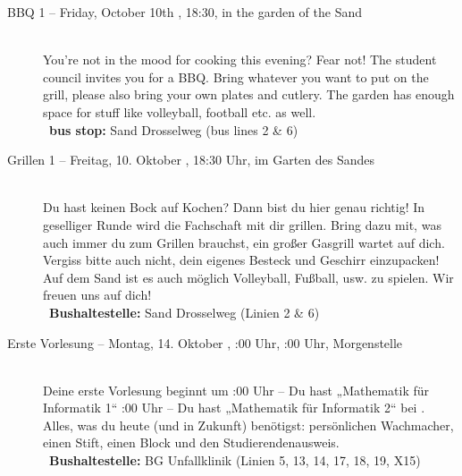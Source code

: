 \begin{description}

\ifml
    \item[BBQ 1 -- Friday, October 10th \YEAR, 18:30, in the garden of the Sand]~\\
    You're not in the mood for cooking this evening? Fear not!
    The student council invites you for a BBQ. Bring whatever you want to put on the grill,
    please also bring your own plates and cutlery. The garden has enough space for stuff like volleyball, football etc. as well.\\
    ~\textbf{bus stop:} Sand Drosselweg (bus lines 2 \& 6)
\else
    \item[Grillen 1 -- Freitag, 10. Oktober \YEAR, 18:30 Uhr, im Garten des Sandes]~\\
    Du hast keinen Bock auf Kochen? Dann bist du hier genau richtig! In geselliger Runde wird die Fachschaft mit dir grillen.
    Bring dazu mit, was auch immer du zum Grillen brauchst, ein großer Gasgrill wartet auf dich. Vergiss bitte auch nicht, dein eigenes Besteck und Geschirr einzupacken!\\
    Auf dem Sand ist es auch möglich Volleyball, Fußball, usw. zu spielen. Wir freuen uns auf dich!\\
    ~\textbf{Bushaltestelle:} Sand Drosselweg (Linien 2 \& 6)
\fi

\ifbachelor
    \item[Erste Vorlesung -- Montag, 14. Oktober \YEAR, \ifwintersemester 8:00 Uhr, \else 10:00 Uhr, \fi Morgenstelle]~\\
    Deine erste Vorlesung beginnt um
    :00 Uhr -- Du hast „Mathematik für Informatik 1“  \fi
    :00 Uhr -- Du hast „Mathematik für Informatik 2“  \fi
    bei \Matheprof.
    Alles, was du heute (und in Zukunft) benötigst: persönlichen Wachmacher, einen Stift, einen Block und den Studierendenausweis.\\
    ~\textbf{Bushaltestelle:} BG Unfallklinik (Linien 5, 13, 14, 17, 18, 19, X15)
\fi


\end{description}
